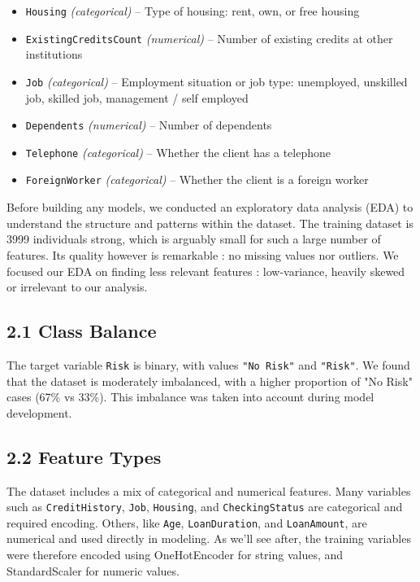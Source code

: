\documentclass[12pt]{report}
\begin{document}
\begin{itemize}
    \item \texttt{Housing} \textit{(categorical)} – Type of housing: rent, own, or free housing
    \item \texttt{ExistingCreditsCount} \textit{(numerical)} – Number of existing credits at other institutions
    \item \texttt{Job} \textit{(categorical)} – Employment situation or job type: unemployed, unskilled job, skilled job, management / self employed 
    \item \texttt{Dependents} \textit{(numerical)}  – Number of dependents
    \item \texttt{Telephone} \textit{(categorical)} – Whether the client has a telephone
    \item \texttt{ForeignWorker} \textit{(categorical)} – Whether the client is a foreign worker
\end{itemize}

Before building any models, we conducted an exploratory data analysis (EDA) to understand the structure and patterns within the dataset. The training dataset is 3999 individuals strong, which is arguably small for such a large number of features. Its quality however is remarkable : no missing values nor outliers. We focused our EDA on finding less relevant features : low-variance, heavily skewed or irrelevant to our analysis.

\subsection*{2.1 Class Balance}

The target variable \texttt{Risk} is binary, with values \texttt{"No Risk"} and \texttt{"Risk"}. We found that the dataset is moderately imbalanced, with a higher proportion of "No Risk" cases (67\% vs 33\%). This imbalance was taken into account during model development.

\subsection*{2.2 Feature Types}

The dataset includes a mix of categorical and numerical features. Many variables such as \texttt{CreditHistory}, \texttt{Job}, \texttt{Housing}, and \texttt{CheckingStatus} are categorical and required encoding. Others, like \texttt{Age}, \texttt{LoanDuration}, and \texttt{LoanAmount}, are numerical and used directly in modeling. As we'll see after, the training variables were therefore encoded using OneHotEncoder for string values, and StandardScaler for numeric values.
\end{document}
